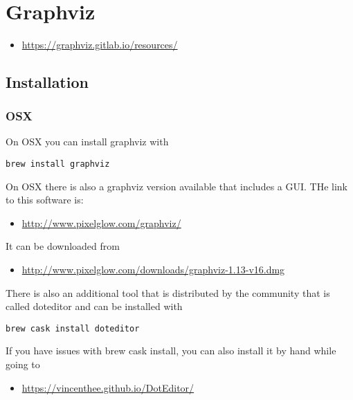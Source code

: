 \MDNAME\

\section{Graphviz}

\begin{itemize}
\item
  \url{https://graphviz.gitlab.io/resources/}
\end{itemize}

\subsection{Installation}

\subsubsection{OSX}

On OSX you can install graphviz with

\begin{lstlisting}
brew install graphviz
\end{lstlisting}

On OSX there is also a graphviz version available that includes a GUI.
THe link to this software is:

\begin{itemize}
\item
  \url{http://www.pixelglow.com/graphviz/}
\end{itemize}

It can be downloaded from

\begin{itemize}
\item
  \url{http://www.pixelglow.com/downloads/graphviz-1.13-v16.dmg}
\end{itemize}

There is also an additional tool that is distributed by the community
that is called doteditor and can be installed with

\begin{lstlisting}
brew cask install doteditor
\end{lstlisting}

If you have issues with brew cask install, you can also install it by
hand while going to

\begin{itemize}
\item
  \url{https://vincenthee.github.io/DotEditor/}
\end{itemize}

